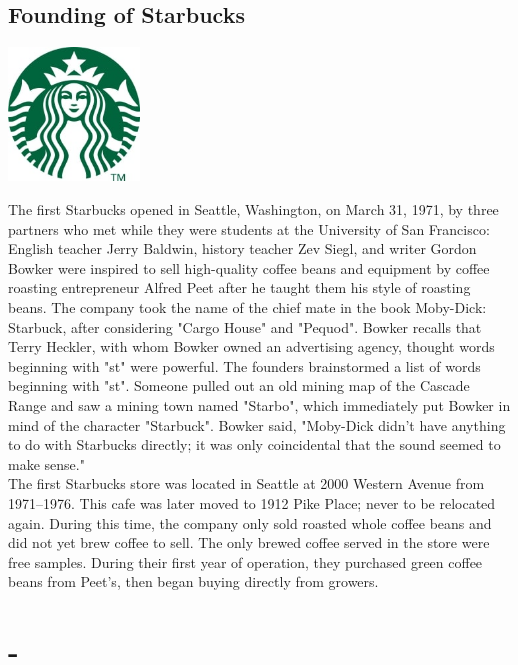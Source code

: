 \documentclass[11pt]{report}
\begin{document}
\subsection{Founding of Starbucks}
\vspace{2mm}\begin{center}\includegraphics[width=3.5cm]{./img/starbucksLogo.jpg}\end{center}
The first Starbucks opened in Seattle, Washington, on March 31, 1971, by three partners who met while they were students at the University of San Francisco: English teacher Jerry Baldwin, history teacher Zev Siegl, and writer Gordon Bowker were inspired to sell high-quality coffee beans and equipment by coffee roasting entrepreneur Alfred Peet after he taught them his style of roasting beans. The company took the name of the chief mate in the book Moby-Dick: Starbuck, after considering "Cargo House" and "Pequod". Bowker recalls that Terry Heckler, with whom Bowker owned an advertising agency, thought words beginning with "st" were powerful. The founders brainstormed a list of words beginning with "st". Someone pulled out an old mining map of the Cascade Range and saw a mining town named "Starbo", which immediately put Bowker in mind of the character "Starbuck". Bowker said, "Moby-Dick didn't have anything to do with Starbucks directly; it was only coincidental that the sound seemed to make sense."\\ \indent The first Starbucks store was located in Seattle at 2000 Western Avenue from 1971–1976. This cafe was later moved to 1912 Pike Place; never to be relocated again. During this time, the company only sold roasted whole coffee beans and did not yet brew coffee to sell. The only brewed coffee served in the store were free samples. During their first year of operation, they purchased green coffee beans from Peet's, then began buying directly from growers.
\section{-}
\end{document}
